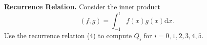 \textbf{Recurrence Relation.} Consider the inner product \[(f,g) =
\int_{-1}^1 f(x) g(x) \mathrm{d}x.\] Use the recurrence relation (4)
to compute $Q_i$ for $i=0,1,2,3,4,5$.
